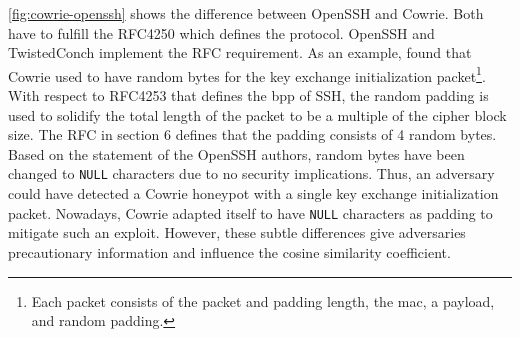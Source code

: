\autoref{fig:cowrie-openssh} shows the difference between OpenSSH and Cowrie.
Both have to fulfill the RFC4250 \cite{rfc4250} which defines the protocol.
OpenSSH and TwistedConch implement the RFC requirement.
As an example, \citet{vetterl2020} found that Cowrie used to have random bytes for the key exchange initialization packet\footnote{Each packet consists of the packet and padding length, the \ac{mac}, a payload, and random padding.}.
With respect to RFC4253 \cite{rfc4253} that defines the \ac{bpp} of SSH, the random padding is used to solidify the total length of the packet to be a multiple of the cipher block size.
The RFC in section 6 defines that the padding consists of 4 random bytes.
Based on the statement of the OpenSSH authors, random bytes have been changed to \verb|NULL| characters due to no security implications.
Thus, an adversary could have detected a Cowrie honeypot with a single key exchange initialization packet.
Nowadays, Cowrie adapted itself to have \verb|NULL| characters as padding to mitigate such an exploit.
However, these subtle differences give adversaries precautionary information and influence the cosine similarity coefficient.

